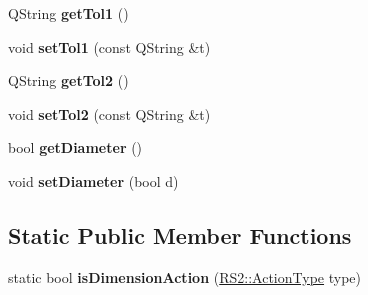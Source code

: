 \begin{DoxyCompactItemize}
\item 
\hypertarget{classRS__ActionDimension_a76e0b8f32d27205fe60088b978d93b2a}{Q\-String {\bfseries get\-Tol1} ()}\label{classRS__ActionDimension_a76e0b8f32d27205fe60088b978d93b2a}

\item 
\hypertarget{classRS__ActionDimension_adba7debd0e1989921840212e258d0aa5}{void {\bfseries set\-Tol1} (const Q\-String \&t)}\label{classRS__ActionDimension_adba7debd0e1989921840212e258d0aa5}

\item 
\hypertarget{classRS__ActionDimension_aa5ccc496bb05028dd4b9e92f342ae74d}{Q\-String {\bfseries get\-Tol2} ()}\label{classRS__ActionDimension_aa5ccc496bb05028dd4b9e92f342ae74d}

\item 
\hypertarget{classRS__ActionDimension_a1b7cd66fc6b5dbb169844a9ff743c22a}{void {\bfseries set\-Tol2} (const Q\-String \&t)}\label{classRS__ActionDimension_a1b7cd66fc6b5dbb169844a9ff743c22a}

\item 
\hypertarget{classRS__ActionDimension_a32960a7752091973d3f9f79871c98398}{bool {\bfseries get\-Diameter} ()}\label{classRS__ActionDimension_a32960a7752091973d3f9f79871c98398}

\item 
\hypertarget{classRS__ActionDimension_a88103deb3cdb113c5e6e6e0dd936bfe1}{void {\bfseries set\-Diameter} (bool d)}\label{classRS__ActionDimension_a88103deb3cdb113c5e6e6e0dd936bfe1}

\end{DoxyCompactItemize}
\subsection*{Static Public Member Functions}
\begin{DoxyCompactItemize}
\item 
\hypertarget{classRS__ActionDimension_aa23d8380fce57964584825325287bccd}{static bool {\bfseries is\-Dimension\-Action} (\hyperlink{classRS2_afe3523e0bc41fd637b892321cfc4b9d7}{R\-S2\-::\-Action\-Type} type)}\label{classRS__ActionDimension_aa23d8380fce57964584825325287bccd}

\end{DoxyCompactItemize}
